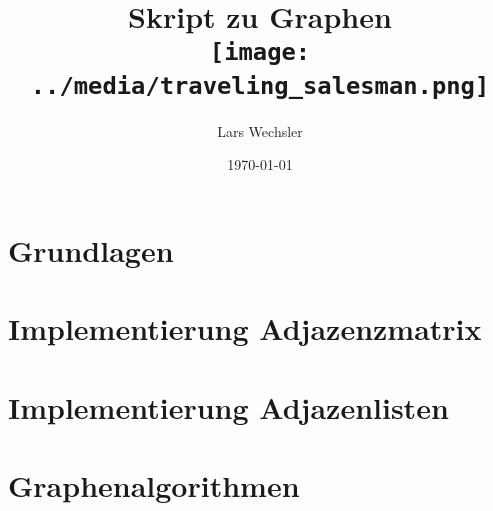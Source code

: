 \documentclass{article}
\author{Lars Wechsler}
\title{Skript zu Graphen \\ \centering\texttt{[image: ../media/traveling\_salesman.png]}}
\date{\today}
\begin{document}
\maketitle
\newpage
\tableofcontents
\newpage 

\section{Grundlagen}


\newpage

\section{Implementierung Adjazenzmatrix}


\newpage

\section{Implementierung Adjazenlisten}


\newpage 

\section{Graphenalgorithmen}

\end{document}
